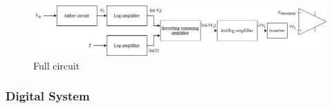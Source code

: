 \documentclass[a4paper, 12pt, oneside]{book}
\begin{document}
\begin{figure}[H]
  \centering
  \includegraphics[scale=0.5]{full_circuit.png}
  \caption{Full circuit}
\end{figure}



\subsubsection{Digital System}\label{b}
\end{document}
